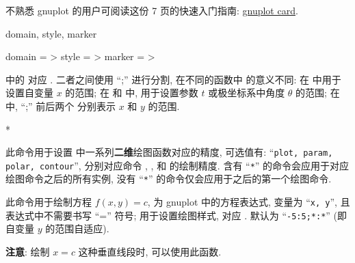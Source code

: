\documentclass[
  hyper, lang=cn, 
  class=l3dox, 
]{../../zlatex/code/ztex}
\begin{document}
不熟悉 gnuplot 的用户可阅读这份 7 页的快速入门指南: \href{http://www.gnuplot.info/docs_4.0/gpcard.pdf}{gnuplot card}.


\begin{keyval}[parent=ztikz/2dplot]{domain, style, marker}
  \begin{syntax}
    domain  = >
    style   = >
    marker  = >
  \end{syntax}
   中的  对应 . 
  二者之间使用 ``;'' 进行分割, 在不同的函数中  的意义不同: 
  在  中用于设置自变量 $x$ 的范围; 在  和  中, 
  用于设置参数 $t$ 或极坐标系中角度 $\theta$ 的范围; 在  中, ``;'' 前后两个
   分别表示 $x$ 和 $y$ 的范围.
\end{keyval}


\begin{function}[added=2025-05-15]{\PlotPrecise}
  \begin{syntax}
    *
  \end{syntax}
  此命令用于设置  中一系列\textbf{二维}绘图函数对应的精度,  可选值有:
  ``\texttt{plot, param, polar, contour}'', 分别对应命令 , ,  和 
  的绘制精度. 含有 ``\texttt{*}'' 的命令会应用于对应绘图命令之后的所有实例, 没有 ``\texttt{*}'' 的命令仅会应用于之后的第一个绘图命令.
\end{function}





\begin{function}[added=2025-05-15]{\ContourPlot}
  \begin{syntax}
  \end{syntax}
  此命令用于绘制方程 $f(x, y)=c$,  为 gnuplot 中的方程表达式, 变量为 ``\texttt{x, y}'', 
  且表达式中不需要书写 ``='' 符号;  用于设置绘图样式, 对应 . 
  默认为 ``\texttt{-5:5;*:*}'' (即自变量 $y$ 的范围自适应).\par 
  \noindent\textbf{注意}: 绘制 $x=c$ 这种垂直线段时, 可以使用此函数.
\end{function}
\end{document}
